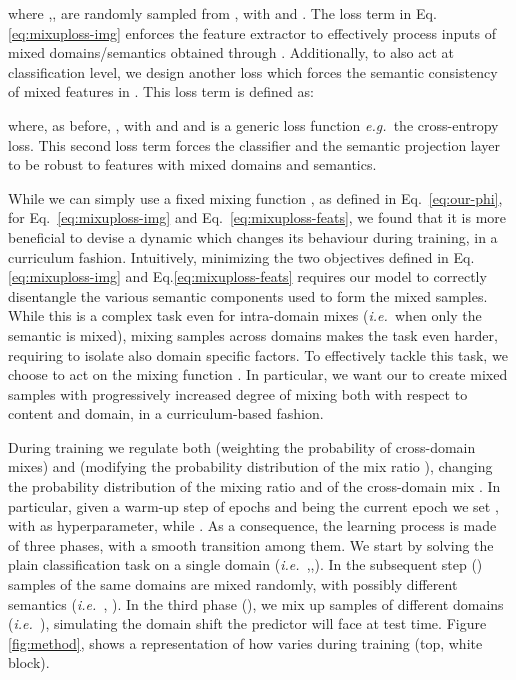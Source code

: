 \documentclass[runningheads]{llncs}
\newcommand{\eg}{\emph{e.g.~}}
\newcommand{\ie}{\emph{i.e.~}}
\begin{document}
where ,, are randomly sampled from , with  and . 
The loss term in Eq. \eqref{eq:mixuploss-img} enforces the feature extractor to effectively process inputs of mixed domains/semantics obtained through . Additionally, to also act at classification level, we design another loss which forces the semantic consistency of mixed features in . This loss term is defined as: 
 
where, as before, , with  and  and  is a generic loss function \eg the cross-entropy loss. 
This second loss term forces the classifier  and the semantic projection layer  to be robust to features with mixed domains and semantics. 

While we can simply use a fixed mixing function , as defined in Eq.~\eqref{eq:our-phi}, for Eq.~\eqref{eq:mixuploss-img} and Eq.~\eqref{eq:mixuploss-feats}, we found that it is more beneficial to devise a dynamic  which changes its behaviour during training, in a curriculum fashion. Intuitively, minimizing the two objectives defined in Eq.\eqref{eq:mixuploss-img} and Eq.\eqref{eq:mixuploss-feats} {requires our model to correctly disentangle the various semantic components used to form the mixed samples.} While this is a complex task even for intra-domain mixes (\ie when only the semantic is mixed), mixing samples across domains makes the task even harder, requiring to isolate also domain specific factors. 
To effectively tackle this task, we choose to act on the mixing function . {In particular, we want our  to create mixed samples with progressively increased degree of mixing both with respect to content and domain, in a curriculum-based fashion}. 

During training we regulate both  (weighting the probability of cross-domain mixes) and  (modifying the probability distribution of the mix ratio ), changing the probability distribution of the mixing ratio  and of the cross-domain mix . In particular, given a warm-up step of  epochs and being  the current epoch we set , with  as hyperparameter, while . As a consequence, the learning process is made of three phases, with a smooth transition among them. We start by solving the plain classification task on a single domain (\ie ,,). In the subsequent step () samples of the same domains are mixed randomly, with possibly different semantics (\ie , ). In the third phase (), we mix up samples of different domains (\ie ), simulating the domain shift the predictor will face at test time. Figure \ref{fig:method}, shows a representation of how  varies during training (top, white block).   
\end{document}
